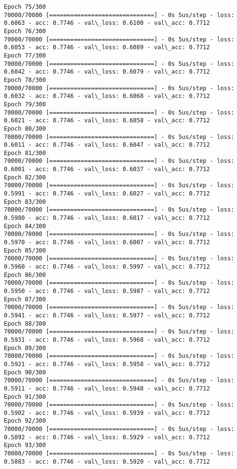 \documentclass[11pt]{article}
\begin{document}
\begin{Verbatim}[commandchars=\\\{\}]
Epoch 75/300
70000/70000 [==============================] - 0s 5us/step - loss: 0.6063 - acc: 0.7746 - val\_loss: 0.6100 - val\_acc: 0.7712
Epoch 76/300
70000/70000 [==============================] - 0s 5us/step - loss: 0.6053 - acc: 0.7746 - val\_loss: 0.6089 - val\_acc: 0.7712
Epoch 77/300
70000/70000 [==============================] - 0s 5us/step - loss: 0.6042 - acc: 0.7746 - val\_loss: 0.6079 - val\_acc: 0.7712
Epoch 78/300
70000/70000 [==============================] - 0s 5us/step - loss: 0.6032 - acc: 0.7746 - val\_loss: 0.6068 - val\_acc: 0.7712
Epoch 79/300
70000/70000 [==============================] - 0s 5us/step - loss: 0.6021 - acc: 0.7746 - val\_loss: 0.6058 - val\_acc: 0.7712
Epoch 80/300
70000/70000 [==============================] - 0s 5us/step - loss: 0.6011 - acc: 0.7746 - val\_loss: 0.6047 - val\_acc: 0.7712
Epoch 81/300
70000/70000 [==============================] - 0s 5us/step - loss: 0.6001 - acc: 0.7746 - val\_loss: 0.6037 - val\_acc: 0.7712
Epoch 82/300
70000/70000 [==============================] - 0s 5us/step - loss: 0.5991 - acc: 0.7746 - val\_loss: 0.6027 - val\_acc: 0.7712
Epoch 83/300
70000/70000 [==============================] - 0s 5us/step - loss: 0.5980 - acc: 0.7746 - val\_loss: 0.6017 - val\_acc: 0.7712
Epoch 84/300
70000/70000 [==============================] - 0s 5us/step - loss: 0.5970 - acc: 0.7746 - val\_loss: 0.6007 - val\_acc: 0.7712
Epoch 85/300
70000/70000 [==============================] - 0s 5us/step - loss: 0.5960 - acc: 0.7746 - val\_loss: 0.5997 - val\_acc: 0.7712
Epoch 86/300
70000/70000 [==============================] - 0s 5us/step - loss: 0.5950 - acc: 0.7746 - val\_loss: 0.5987 - val\_acc: 0.7712
Epoch 87/300
70000/70000 [==============================] - 0s 5us/step - loss: 0.5941 - acc: 0.7746 - val\_loss: 0.5977 - val\_acc: 0.7712
Epoch 88/300
70000/70000 [==============================] - 0s 5us/step - loss: 0.5931 - acc: 0.7746 - val\_loss: 0.5968 - val\_acc: 0.7712
Epoch 89/300
70000/70000 [==============================] - 0s 5us/step - loss: 0.5921 - acc: 0.7746 - val\_loss: 0.5958 - val\_acc: 0.7712
Epoch 90/300
70000/70000 [==============================] - 0s 5us/step - loss: 0.5911 - acc: 0.7746 - val\_loss: 0.5948 - val\_acc: 0.7712
Epoch 91/300
70000/70000 [==============================] - 0s 5us/step - loss: 0.5902 - acc: 0.7746 - val\_loss: 0.5939 - val\_acc: 0.7712
Epoch 92/300
70000/70000 [==============================] - 0s 5us/step - loss: 0.5892 - acc: 0.7746 - val\_loss: 0.5929 - val\_acc: 0.7712
Epoch 93/300
70000/70000 [==============================] - 0s 5us/step - loss: 0.5883 - acc: 0.7746 - val\_loss: 0.5920 - val\_acc: 0.7712

\end{Verbatim}
\end{document}
